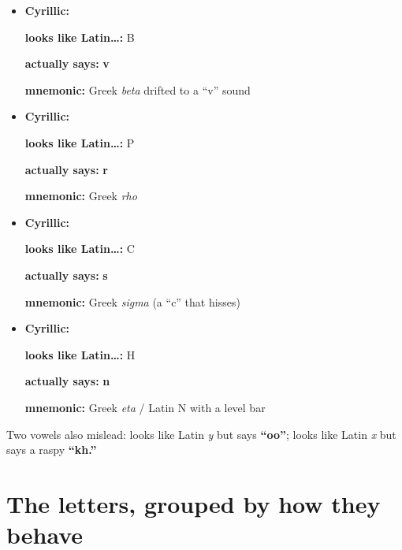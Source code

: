 \begin{itemize}
\raggedright
\setlength{\itemsep}{0.35em}
  \item \begin{minipage}[t]{\linewidth}
  \textbf{Cyrillic:} \textbf{}
  \par \textbf{looks like Latin…:} B
  \par \textbf{actually says:} \textbf{v}
  \par \textbf{mnemonic:} Greek \emph{beta} drifted to a \textquotedblleft{}v\textquotedblright{} sound
  \end{minipage}
  \item \begin{minipage}[t]{\linewidth}
  \textbf{Cyrillic:} \textbf{}
  \par \textbf{looks like Latin…:} P
  \par \textbf{actually says:} \textbf{r}
  \par \textbf{mnemonic:} Greek \emph{rho}
  \end{minipage}
  \item \begin{minipage}[t]{\linewidth}
  \textbf{Cyrillic:} \textbf{}
  \par \textbf{looks like Latin…:} C
  \par \textbf{actually says:} \textbf{s}
  \par \textbf{mnemonic:} Greek \emph{sigma} (a \textquotedblleft{}c\textquotedblright{} that hisses)
  \end{minipage}
  \item \begin{minipage}[t]{\linewidth}
  \textbf{Cyrillic:} \textbf{}
  \par \textbf{looks like Latin…:} H
  \par \textbf{actually says:} \textbf{n}
  \par \textbf{mnemonic:} Greek \emph{eta} / Latin N with a level bar
  \end{minipage}
\end{itemize}

Two vowels also mislead: \textbf{} looks like Latin \emph{y} but says \textbf{\textquotedblleft{}oo\textquotedblright{}}; \textbf{} looks like Latin \emph{x} but says a raspy \textbf{\textquotedblleft{}kh.\textquotedblright{}}

\section*{The letters, grouped by how they behave}

